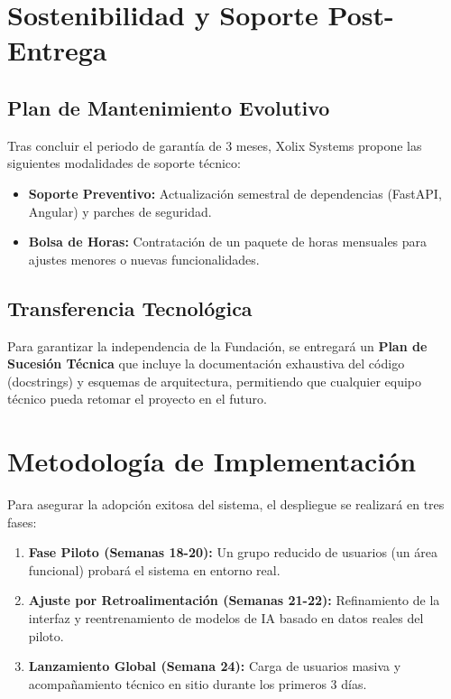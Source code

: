 \documentclass[12pt,letterpaper]{article}
\begin{document}
\section{Sostenibilidad y Soporte Post-Entrega}

\subsection{Plan de Mantenimiento Evolutivo}
Tras concluir el periodo de garantía de 3 meses, Xolix Systems propone las siguientes modalidades de soporte técnico:
\begin{itemize}
    \item \textbf{Soporte Preventivo:} Actualización semestral de dependencias (FastAPI, Angular) y parches de seguridad.
    \item \textbf{Bolsa de Horas:} Contratación de un paquete de horas mensuales para ajustes menores o nuevas funcionalidades.
\end{itemize}

\subsection{Transferencia Tecnológica}
Para garantizar la independencia de la Fundación, se entregará un \textbf{Plan de Sucesión Técnica} que incluye la documentación exhaustiva del código (docstrings) y esquemas de arquitectura, permitiendo que cualquier equipo técnico pueda retomar el proyecto en el futuro.

\section{Metodología de Implementación}
Para asegurar la adopción exitosa del sistema, el despliegue se realizará en tres fases:
\begin{enumerate}
    \item \textbf{Fase Piloto (Semanas 18-20):} Un grupo reducido de usuarios (un área funcional) probará el sistema en entorno real.
    \item \textbf{Ajuste por Retroalimentación (Semanas 21-22):} Refinamiento de la interfaz y reentrenamiento de modelos de IA basado en datos reales del piloto.
    \item \textbf{Lanzamiento Global (Semana 24):} Carga de usuarios masiva y acompañamiento técnico en sitio durante los primeros 3 días.
\end{enumerate}


\newpage
\end{document}
